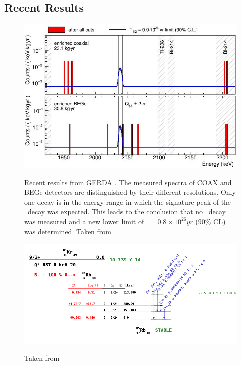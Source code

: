 \documentclass[encoding=utf8,british]{tumphthesis}
\begin{document}
\subsection{Recent Results}
\label{sec:ResultsofGERDA}
\begin{figure}[t!]
	\centering
	\begin{minipage}{0.567813662\textwidth}
		\centering
		\includegraphics[width=\textwidth]{./Bilder/GerdaErgebnisse.png}
		\caption{Recent results from GERDA \PII. The measured spectra of COAX and BEGe detectors are distinguished by their different resolutions.  Only one decay is in the energy range in which the signature peak of the \onbb\ decay was expected. This leads to the conclusion that no \onbb\ decay was measured and a new lower limit of \thalfzero\ = $0.8\times10^{26}\unit{yr}$ (90$\%$ CL) was determined. Taken from \cite{zsigmond_new_2018}}
		\label{fig:GerdaErgebnisse}
	\end{minipage}\hfill%
	\begin{minipage}{.35\textwidth}
		\centering
	\includegraphics[width=\textwidth]{./Bilder/Kr85Decay.png}
	\label{fig:Decay}
	\caption{Taken from \cite{noauthor_decay_nodate}
	}
	\end{minipage}
\end{figure}
\end{document}
